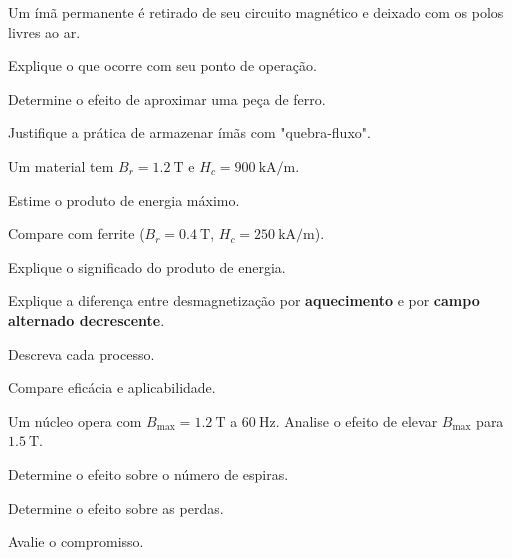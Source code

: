 \begin{questao}[3]{}

Um ímã permanente é retirado de seu circuito magnético e deixado com os polos
livres ao ar.
\begin{itensq}
\item Explique o que ocorre com seu ponto de operação.
\item Determine o efeito de aproximar uma peça de ferro.
\item Justifique a prática de armazenar ímãs com "quebra-fluxo".
\end{itensq}


\end{questao}
\begin{questao}[3]{}

Um material tem $B_r=\SI{1.2}{\tesla}$ e $H_c=\SI{900}{\kilo\ampere\per\meter}$.
\begin{itensq}
\item Estime o produto de energia máximo.
\item Compare com ferrite ($B_r=\SI{0.4}{\tesla}$,
      $H_c=\SI{250}{\kilo\ampere\per\meter}$).
\item Explique o significado do produto de energia.
\end{itensq}


\end{questao}
\begin{questao}[3]{}

Explique a diferença entre desmagnetização por \textbf{aquecimento} e por
\textbf{campo alternado decrescente}.
\begin{itensq}
\item Descreva cada processo.
\item Compare eficácia e aplicabilidade.
\end{itensq}


\end{questao}
\begin{questao}[3]{}

Um núcleo opera com $B_{\max}=\SI{1.2}{\tesla}$ a $\SI{60}{\hertz}$. Analise o
efeito de elevar $B_{\max}$ para $\SI{1.5}{\tesla}$.
\begin{itensq}
\item Determine o efeito sobre o número de espiras.
\item Determine o efeito sobre as perdas.
\item Avalie o compromisso.
\end{itensq}


\end{questao}
